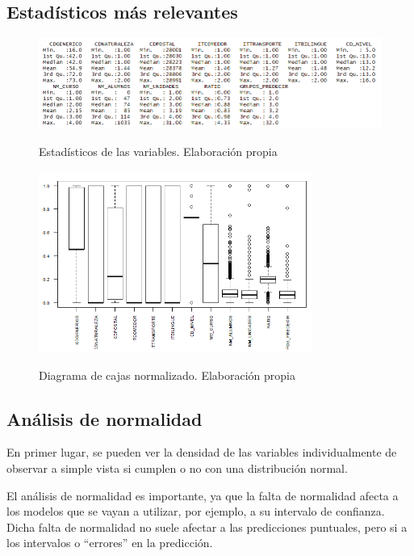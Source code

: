 \begin{subappendices}
\subsection{Estadísticos más relevantes}
\begin{figure}[htb]
	\centering
	\caption{Estadísticos de las variables. Elaboración propia}
	\includegraphics[width=1\textwidth]{recursos/ImagenesR/estadisticos}
	\label{fig:estadisticos}
\end{figure}
\FloatBarrier

\begin{figure}[htb]
	\centering
	\caption{Diagrama de cajas normalizado. Elaboración propia}
	\includegraphics[width=0.8\textwidth]{recursos/ImagenesR/boxplotNorm}
	\label{fig:boxplotNorm}
\end{figure}
\FloatBarrier


\subsection{Análisis de normalidad}
En primer lugar, se pueden ver la densidad de las variables individualmente de observar a simple vista si cumplen o no con una distribución normal. 

El análisis de normalidad es importante, ya que la falta de normalidad afecta a los modelos que se vayan a utilizar, por ejemplo, a su intervalo de confianza. Dicha falta de normalidad no suele afectar a las predicciones puntuales, pero si a los intervalos o ``errores'' en la predicción.


\end{subappendices}
